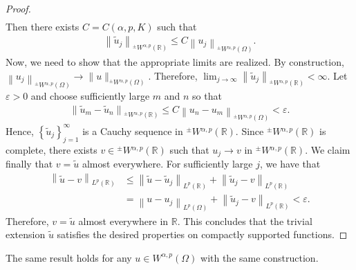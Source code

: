 \documentclass[leqno,final]{siamltex}
\numberwithin{equation}{section}
\newcommand{\eps}{\varepsilon}
\renewcommand{\(}{\bigl(}
\renewcommand{\)}{\bigr)}
\newcommand{\R}{\mathbb{R}}
\begin{document}
\begin{proof}
\begin{align*}
        \end{align*}
        Then there exists $C= C(\alpha,p,K)$ such that 
        \begin{align*}
            \left\|\tilde{u}_j\right\|_{{^{\pm}}{W}{^{\alpha,p}}(\R)} \leq C \left\|u_j\right\|_{{^{\pm}}{W}{^{\alpha,p}}(\Omega)}.
        \end{align*}
        Now, we need to show that the appropriate limits are realized. By construction, $\left\|u_j \right\|_{{^{\pm}}{W}{^{\alpha,p}}(\Omega)} \rightarrow \|u\|_{{^{\pm}}{W}{^{\alpha,p}}(\Omega)}.$ Therefore, $\lim_{j\rightarrow \infty} \left\|\tilde{u}_j\right\|_{{^{\pm}}{W}{^{\alpha,p}}(\R)} < \infty$. Let $\eps > 0$ and choose sufficiently large $m$ and $n$ so that
        \begin{align*}
            \left\|\tilde{u}_m - \tilde{u}_n\right\|_{{^{\pm}}{W}{^{\alpha,p}}(\R)} \leq C \left\|u_n - u_m \right\|_{{^{\pm}}{W}{^{\alpha,p}}(\Omega)} < \eps.
        \end{align*}
        Hence, $\left\{\tilde{u}_j\right\}_{j=1}^{\infty}$ is a Cauchy sequence in ${^{\pm}}{W}{^{\alpha,p}}(\R)$. Since ${^{\pm}}{W}{^{\alpha,p}}(\R)$ is complete, there exists $v\in {^{\pm}}{W}{^{\alpha,p}}(\R)$ such that $u_j \rightarrow v$ in ${^{\pm}}{W}{^{\alpha,p}}(\R)$. We claim finally that $v = \tilde{u}$ almost everywhere. For sufficiently large $j$, we have that
        \begin{align*}
            \left\|\tilde{u} - v \right\|_{L^{p}(\R)}&\leq \left\|\tilde{u} - \tilde{u}_j\right\|_{L^{p}(\R)}+\left\|\tilde{u}_j - v\right\|_{L^{p}(\R)}\\
            &= \left\|u - u_j \right\|_{L^{p}(\Omega)} + \left\|\tilde{u}_j - v\right\|_{L^{p}(\R)} 
            < \eps. 
        \end{align*}
        Therefore, $v= \tilde{u}$ almost everywhere in $\R$. %
        This concludes that the trivial extension $\tilde{u}$ satisfies the desired properties on compactly supported functions.
    \end{proof}
    
    \begin{corollary}
         The same result holds for any $u \in  {W}^{\alpha,p}(\Omega)$ with the same construction. 
    \end{corollary}
    
\end{document}
